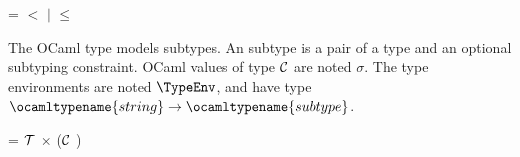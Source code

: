 \noindent {}  = 
$\pmb{<}$ $\mid$ $\pmb{\leqslant}$

\smallskip

The OCaml type  models \ASN subtypes. An \ASN
subtype is a pair of a type and an optional subtyping constraint.
OCaml values of type ${\cal C}$  are noted
$\sigma$. The type environments are noted $\TypeEnv$, and have type
$\ocamltypename{string} \rightarrow \ocamltypename{subtype}$.

\smallskip

\noindent {}  = 
  ${\cal T}$ $\times$ (${\cal C}$ )
